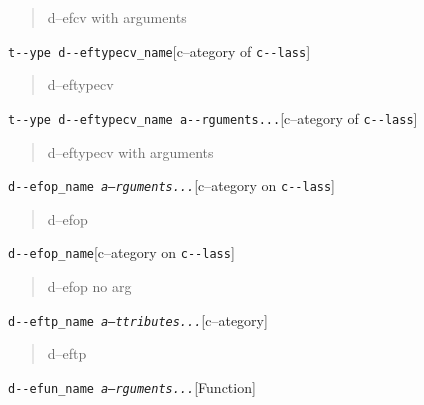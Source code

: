 \documentclass{book}
\begin{document}
%
\begin{quote}
\unskip{\parskip=0pt\noindent}%
d--efcv with arguments
\end{quote}

\noindent\texttt{t{-}{-}ype d{-}{-}eftypecv\_name}\hfill[c--ategory of \texttt{c{-}{-}lass}]



%
\begin{quote}
\unskip{\parskip=0pt\noindent}%
d--eftypecv
\end{quote}

\noindent\texttt{t{-}{-}ype d{-}{-}eftypecv\_name a{-}{-}rguments...}\hfill[c--ategory of \texttt{c{-}{-}lass}]



%
\begin{quote}
\unskip{\parskip=0pt\noindent}%
d--eftypecv with arguments
\end{quote}

\noindent\texttt{d{-}{-}efop\_name \EmbracOn{}\textnormal{\textsl{a--rguments...}}\EmbracOff{}}\hfill[c--ategory on \texttt{c{-}{-}lass}]



%
\begin{quote}
\unskip{\parskip=0pt\noindent}%
d--efop
\end{quote}

\noindent\texttt{d{-}{-}efop\_name}\hfill[c--ategory on \texttt{c{-}{-}lass}]



%
\begin{quote}
\unskip{\parskip=0pt\noindent}%
d--efop no arg
\end{quote}

\noindent\texttt{d{-}{-}eftp\_name \EmbracOn{}\textnormal{\textsl{a--ttributes...}}\EmbracOff{}}\hfill[c--ategory]



%
\begin{quote}
\unskip{\parskip=0pt\noindent}%
d--eftp
\end{quote}

\noindent\texttt{d{-}{-}efun\_name \EmbracOn{}\textnormal{\textsl{a--rguments...}}\EmbracOff{}}\hfill[Function]
\end{document}
